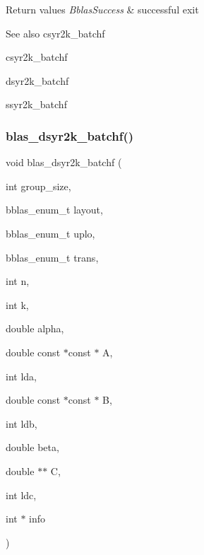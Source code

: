 \begin{DoxyRetVals}{Return values}
{\em Bblas\+Success} & successful exit\\
\hline
\end{DoxyRetVals}
\begin{DoxySeeAlso}{See also}
csyr2k\+\_\+batchf 

csyr2k\+\_\+batchf 

dsyr2k\+\_\+batchf 

ssyr2k\+\_\+batchf 
\end{DoxySeeAlso}
\mbox{\label{group__syr2k__batchf_gab280fe015e82c196cc9c20811a4df110}} 
\subsubsection{\texorpdfstring{blas\+\_\+dsyr2k\+\_\+batchf()}{blas\_dsyr2k\_batchf()}}
{\footnotesize\ttfamily void blas\+\_\+dsyr2k\+\_\+batchf (\begin{DoxyParamCaption}\item[{int}]{group\+\_\+size,  }\item[{bblas\+\_\+enum\+\_\+t}]{layout,  }\item[{bblas\+\_\+enum\+\_\+t}]{uplo,  }\item[{bblas\+\_\+enum\+\_\+t}]{trans,  }\item[{int}]{n,  }\item[{int}]{k,  }\item[{double}]{alpha,  }\item[{double const $\ast$const $\ast$}]{A,  }\item[{int}]{lda,  }\item[{double const $\ast$const $\ast$}]{B,  }\item[{int}]{ldb,  }\item[{double}]{beta,  }\item[{double $\ast$$\ast$}]{C,  }\item[{int}]{ldc,  }\item[{int $\ast$}]{info }\end{DoxyParamCaption})}

